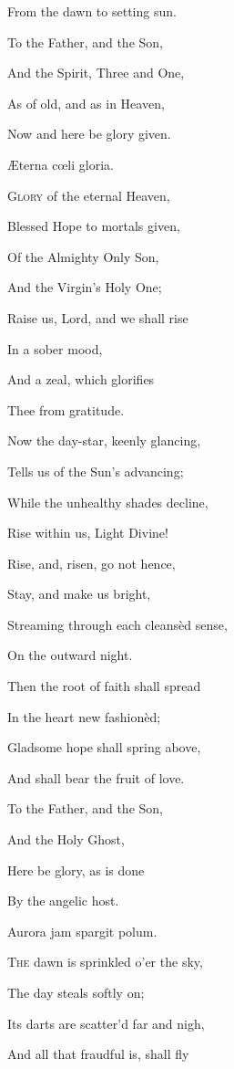 From the dawn to setting sun.

To the Father, and the Son,

And the Spirit, Three and One,

As of old, and as in Heaven,

Now and here be glory given.


Æterna cœli
gloria.

G\textsc{lory} of the eternal Heaven,

Blessed Hope to mortals given,

Of the Almighty Only Son,

And the Virgin's Holy One;

Raise us, Lord, and we shall rise

In a sober mood,

And a zeal, which glorifies

Thee from
gratitude.

Now the day-star, keenly glancing,

Tells us of the Sun's advancing;

While the unhealthy shades decline,

Rise within us, Light Divine!

Rise, and, risen, go not hence,

Stay, and make us
bright,

Streaming through each cleansèd sense,

On the outward
night. 

Then the root of faith shall spread

In the heart new fashionèd;

Gladsome hope shall spring above,

And shall bear the fruit of love.

To the Father, and the Son,

And the Holy Ghost,

Here be glory, as is done

By the angelic
host.


Aurora jam spargit polum.

T\textsc{he} dawn is sprinkled o'er the sky,

The day steals
softly on;

Its darts are scatter'd far and nigh,

And all that fraudful is, shall fly


